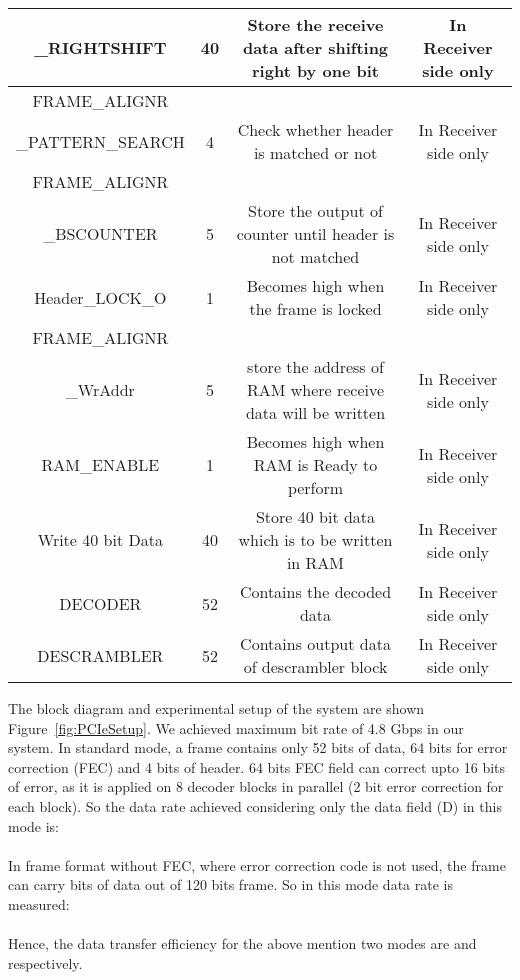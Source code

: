 \documentclass[10pt, conference, compsocconf]{IEEEtran}
\begin{document}
\begin{table*}[htb]
\begin{center}
{\begin{tabular}  {|c|c|c|c|}
\_RIGHTSHIFT  &40 & Store the receive data after shifting right by one bit & In Receiver side only\\
\hline
FRAME\_ALIGNR &&&
\\
\_PATTERN\_SEARCH  &4 & Check whether header is matched or not & In Receiver side only\\
\hline 
FRAME\_ALIGNR &&&
\\
\_BSCOUNTER  & 5& Store the output of counter until header is not matched & In Receiver side only\\
\hline 
Header\_LOCK\_O  & 1& Becomes high when the frame is locked & In Receiver side only\\
\hline
FRAME\_ALIGNR &&&
\\
\_WrAddr  & 5 & store the address of RAM where receive data will be written & In Receiver side only\\
\hline
RAM\_ENABLE  &1 & Becomes high when RAM is Ready to perform & In Receiver side only\\
\hline
Write 40 bit Data  &40 & Store 40 bit data which is to be written in RAM &  In Receiver side only\\
\hline
DECODER  & 52& Contains the decoded data & In Receiver side only\\
\hline
DESCRAMBLER  & 52& Contains output data of descrambler block & In Receiver side only\\  
\hline
\end{tabular}}
\vspace{-10 pt}
\label{table:SignalName}
\end{center}
\end{table*}
The block diagram and experimental setup of the system are shown Figure~\ref{fig:PCIeSetup}. We achieved maximum bit rate of 4.8 Gbps in our system. In standard mode, a frame contains only 52 bits of data, 64 bits for error correction (FEC) and 4 bits of header. 64 bits  FEC field can correct upto 16 bits of error, as it is applied on 8 decoder blocks in parallel (2 bit error correction for each block). So the data rate achieved considering only the data field (D) in this mode is: \\
 \\
In frame format without FEC, where error correction code is not used, the frame can carry  bits of data out of 120 bits frame.
So in this mode data rate is measured: \\
 \\
Hence, the data transfer efficiency for the above mention two modes are  and  respectively. 
\end{document}
